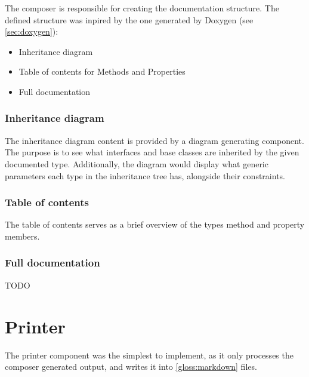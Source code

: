 The composer is responsible for creating the documentation structure. The defined structure was inpired by the one generated by Doxygen (see \ref{sec:doxygen}):
\begin{itemize}
    \item Inheritance diagram
    \item Table of contents for Methods and Properties
    \item Full documentation
\end{itemize}

\subsubsection{Inheritance diagram}

The inheritance diagram content is provided by a diagram generating component. The purpose is to see what interfaces and base classes are inherited by the given documented type. Additionally, the diagram would display what generic parameters each type in the inheritance tree has, alongside their constraints.

\subsubsection{Table of contents}

The table of contents serves as a brief overview of the types method and property members.

\subsubsection{Full documentation}

TODO

\section{Printer}

The printer component was the simplest to implement, as it only processes the composer generated output, and writes it into \ref{gloss:markdown} files.